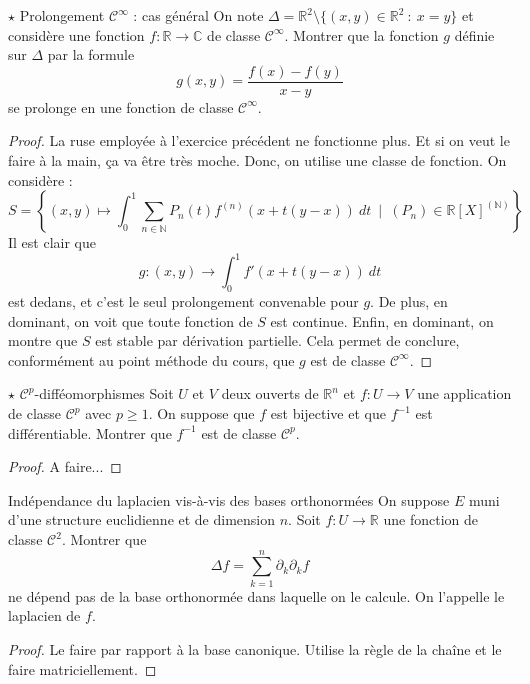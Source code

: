 \documentclass[french,a4paper]{article}
\newcommand{\N}{\mathbb{N}}
\newcommand{\R}{\mathbb{R}}
\newcommand{\C}{\mathbb{C}}
\newcommand{\inv}{^{-1}}
\theoremstyle{plain}
\theoremstyle{definition}
\theoremstyle{remark}
\begin{document}
\begin{ex}[Moulin.25]{$\star$ Prolongement $\mathcal{C}^\infty$ : cas général}
	On note $\Delta=\R^2\setminus\{(x,y)\in\R^2\ : \ x=y\}$ et considère une fonction $f:\R\to\C$ de classe $\mathcal{C}^\infty$. Montrer que la fonction $g$ définie sur $\Delta$ par la formule $$g(x,y)=\frac{f(x)-f(y)}{x-y}$$ se prolonge en une fonction de classe $\mathcal{C}^\infty$.
\end{ex}
\begin{proof}
	La ruse employée à l'exercice précédent ne fonctionne plus. Et si on veut le faire à la main, ça va être très moche. Donc, on utilise une classe de fonction. On considère : $$S=\left\{(x,y)\mapsto\int_{0}^{1}\sum_{n\in\N}P_n(t)f^{(n)}(x+t(y-x))\ dt \ \mid \ (P_n)\in\R[X]^{(\N)}\right\}$$ Il est clair que $$g:(x,y)\to\int_{0}^{1}f'(x+t(y-x))\ dt$$ est dedans, et c'est le seul prolongement convenable pour $g$. De plus, en dominant, on voit que toute fonction de $S$ est continue. Enfin, en dominant, on montre que $S$ est stable par dérivation partielle. Cela permet de conclure, conformément au point méthode du cours, que $g$ est de classe $\mathcal{C}^\infty$.
\end{proof}

\begin{ex}[Moulin.26]{$\star$ $\mathcal{C}^p$-difféomorphismes}
	Soit $U$ et $V$ deux ouverts de $\R^n$ et $f:U\to V$ une application de classe $\mathcal{C}^p$ avec $p\geqslant 1$. On suppose que $f$ est bijective et que $f\inv$ est différentiable. Montrer que $f\inv$ est de classe $\mathcal{C}^p$.
\end{ex}
\begin{proof}
	A faire...
\end{proof}

\begin{ex}[Moulin.27]{Indépendance du laplacien vis-à-vis des bases orthonormées}
	On suppose $E$ muni d'une structure euclidienne et de dimension $n$. Soit $f:U\to\R$ une fonction de classe $\mathcal{C}^2$. Montrer que $$\Delta f=\sum_{k=1}^{n}\partial_k\partial_k f$$ ne dépend pas de la base orthonormée dans laquelle on le calcule. On l'appelle le laplacien de $f$.
\end{ex}
\begin{proof}
	Le faire par rapport à la base canonique. Utilise la règle de la chaîne et le faire matriciellement.
\end{proof}
\end{document}
